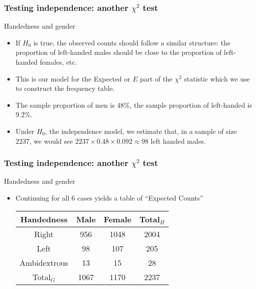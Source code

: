 \documentclass[handout]{beamer}
\begin{document}
   \begin{frame} \frametitle{Testing independence: another $\chi^2$ test}

   \begin{block}
     {Handedness and gender}
     \begin{itemize}
     \item If $H_0$ is true, the observed counts should
       follow a similar structure: the proportion of left-handed
       males should be close to the proportion of left-handed females, etc.
     \item This is our model for the {Expected} or $E$ part of the $\chi^2$
       statistic which we use to construct the frequency table.

     \item The sample proportion of men is {\color{orange} 48\%},
     the sample proportion of
     left-handed is {\color{orange} 9.2\%}.
     \item Under $H_0$, the independence model, we estimate that,
       in a sample of size 2237, we would see $2237 \times 0.48 \times 0.092 \approx 98$ left handed males.
     \end{itemize}
   \end{block}
   \end{frame}


   \begin{frame} \frametitle{Testing independence: another $\chi^2$ test}

   \begin{block}
     {Handedness and gender}
     \begin{itemize}
     \item Continuing for all 6 cases yields a table of
     ``Expected Counts''

     \begin{tabular}{c|c|c|c}
       Handedness & Male & Female & Total$_H$ \\ \hline
       Right & 956 & 1048 & 2004 \\
       Left & 98 & 107 & 205 \\
       Ambidextrous & 13 & 15 & 28 \\ \hline
       Total$_G$ & 1067 & 1170 & 2237
     \end{tabular}
     \end{itemize}
   \end{block}
   \end{frame}
\end{document}
